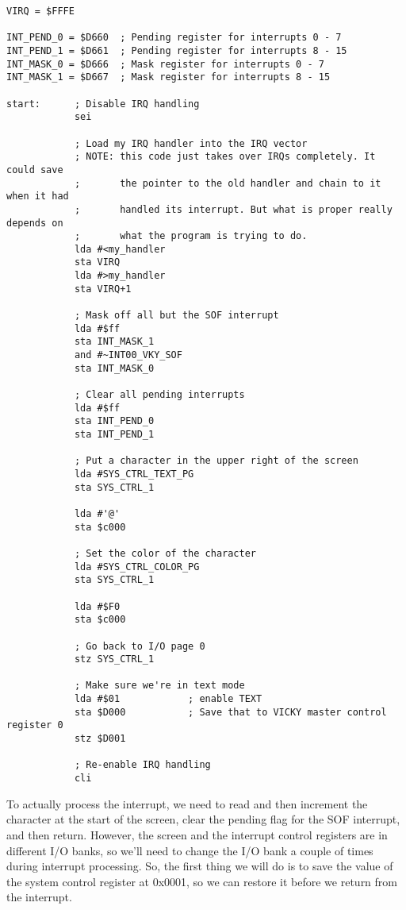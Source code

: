 \begin{verbatim}
VIRQ = $FFFE

INT_PEND_0 = $D660  ; Pending register for interrupts 0 - 7
INT_PEND_1 = $D661  ; Pending register for interrupts 8 - 15
INT_MASK_0 = $D666  ; Mask register for interrupts 0 - 7
INT_MASK_1 = $D667  ; Mask register for interrupts 8 - 15

start:      ; Disable IRQ handling
            sei

            ; Load my IRQ handler into the IRQ vector
            ; NOTE: this code just takes over IRQs completely. It could save
            ;       the pointer to the old handler and chain to it when it had
            ;       handled its interrupt. But what is proper really depends on
            ;       what the program is trying to do.
            lda #<my_handler
            sta VIRQ
            lda #>my_handler
            sta VIRQ+1

            ; Mask off all but the SOF interrupt
            lda #$ff
            sta INT_MASK_1
            and #~INT00_VKY_SOF
            sta INT_MASK_0

            ; Clear all pending interrupts
            lda #$ff
            sta INT_PEND_0
            sta INT_PEND_1

            ; Put a character in the upper right of the screen
            lda #SYS_CTRL_TEXT_PG
            sta SYS_CTRL_1

            lda #'@'
            sta $c000

            ; Set the color of the character
            lda #SYS_CTRL_COLOR_PG
            sta SYS_CTRL_1

            lda #$F0
            sta $c000

            ; Go back to I/O page 0
            stz SYS_CTRL_1

            ; Make sure we're in text mode
            lda #$01            ; enable TEXT
            sta $D000           ; Save that to VICKY master control register 0
            stz $D001

            ; Re-enable IRQ handling
            cli
\end{verbatim}

To actually process the interrupt, we need to read and then increment the character at the start of the screen, clear the pending flag for the SOF interrupt, and then return. However, the screen and the interrupt control registers are in different I/O banks, so we'll need to change the I/O bank a couple of times during interrupt processing. So, the first thing we will do is to save the value of the system control register at 0x0001, so we can restore it before we return from the interrupt.

